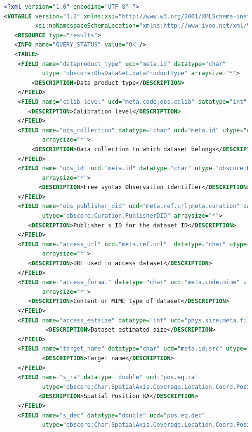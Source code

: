 \documentclass[11pt,a4paper]{ivoa}
\begin{document}
\begin{lstlisting}[basicstyle=\scriptsize,language=XML]
<?xml version="1.0" encoding="UTF-8" ?> 
<VOTABLE version="1.2" xmlns:xsi="http://www.w3.org/2001/XMLSchema-instance" 
         xsi:noNamespaceSchemaLocation="xmlns:http://www.ivoa.net/xml/VOTable-1.2.xsd" >  
   <RESOURCE type="results"> 
   <INFO name="QUERY_STATUS" value="OK"/> 
   <TABLE> 
    <FIELD name="dataproduct_type" ucd="meta.id" datatype="char" 
           utype="obscore:ObsDataSet.dataProductType" arraysize="*"> 
        <DESCRIPTION>Data product type</DESCRIPTION>
    </FIELD> 
    <FIELD name="calib_level" ucd="meta.code;obs.calib" datatype="int" utype="obscore:ObsDataSet.calibLevel"> 
       <DESCRIPTION>Calibration level</DESCRIPTION>
    </FIELD> 
    <FIELD name="obs_collection" datatype="char" ucd="meta.id" utype="obscore:DataID.Collection" 
           arraysize="*">            
        <DESCRIPTION>Data collection to which dataset belongs</DESCRIPTION>  
    </FIELD> 
    <FIELD name="obs_id" ucd="meta.id" datatype="char" utype="obscore:DataID.observationID" 
           arraysize="*"> 
          <DESCRIPTION>Free syntax Observation Identifier</DESCRIPTION>
    </FIELD> 
    <FIELD name="obs_publisher_did" ucd="meta.ref.url;meta.curation" datatype="char"
           utype="obscore:Curation.PublisherDID" arraysize="*"> 
       <DESCRIPTION>Publisher s ID for the dataset ID</DESCRIPTION> 
    </FIELD> 
    <FIELD name="access_url" ucd="meta.ref.url"  datatype="char" utype="obscore:Access.Reference" 
           arraysize="*">
       <DESCRIPTION>URL used to access dataset</DESCRIPTION> 
    </FIELD> 
    <FIELD name="access_format" datatype="char" ucd="meta.code.mime" utype="obscore:Access.Format" 
           arraysize="*"> 
       <DESCRIPTION>Content or MIME type of dataset</DESCRIPTION>          
    </FIELD> 
    <FIELD name="access_estsize" datatype="int" ucd="phys.size;meta.file" utype="obscore:Access.Size"> 
            <DESCRIPTION>Dataset estimated size</DESCRIPTION>
    </FIELD> 
    <FIELD name="target_name" datatype="char" ucd="meta.id;src" utype="obscore:Target.Name" arraysize="*"> 
           <DESCRIPTION>Target name</DESCRIPTION>
    </FIELD> 
    <FIELD name="s_ra" datatype="double" ucd="pos.eq.ra" 
           utype="obscore:Char.SpatialAxis.Coverage.Location.Coord.Position2D.Value2.C1" unit="deg" > 
          <DESCRIPTION>Spatial Position RA</DESCRIPTION>          
    </FIELD> 
    <FIELD name="s_dec" datatype="double" ucd="pos.eq.dec"
           utype="obscore:Char.SpatialAxis.Coverage.Location.Coord.Position2D.Value2.C2" unit="deg" > 

\end{lstlisting}
\end{document}
